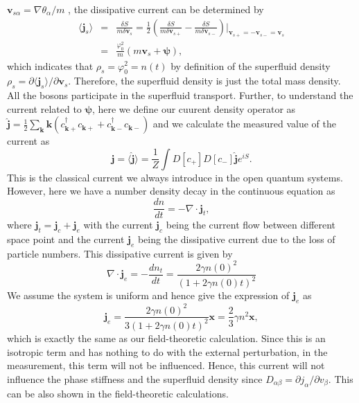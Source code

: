 \documentclass[aps,superscriptaddress,notitlepage,longbibliography]{revtex4-1}
\begin{document}
$\bm{v}_{s\alpha}=\nabla\theta_{\alpha}/m$ \citep{Coleman_2015},
the dissipative current can be determined by 
\begin{eqnarray}
\langle\bm{j}_{s}\rangle & = & \frac{\delta S}{m\delta\bm{v}_{s}}=\frac{1}{2}\left(\frac{\delta S}{m\delta\bm{v}_{s+}}-\frac{\delta S}{m\delta\bm{v}_{s-}}\right)|_{\bm{v}_{s+}=-\bm{v}_{s-}=\bm{v}_{s}}\nonumber \\
 & = & \frac{\varphi_{0}^{2}}{m}(m\bm{v}_{s}+\bm{\psi}),
\end{eqnarray}
which indicates that $\rho_{s}=\varphi_{0}^{2}=n(t)$ by definition
of the superfluid density $\rho_{s}=\partial\langle\bm{j}_{s}\rangle/\partial\bm{v}_{s}$.
Therefore, the superfluid density is just the total mass density.
All the bosons participate in the superfluid transport. Further, to
understand the current related to $\bm{\psi}$, here we define our
cuurent density operator as $\hat{\bm{j}}=\frac{1}{2}\sum_{\bm{k}}\bm{k}(c_{\bm{k}+}^{\dagger}c_{\bm{k}+}+c_{\bm{k}-}^{\dagger}c_{\bm{k}-})$
and we calculate the measured value of the current as 
\begin{equation}
\bm{j}=\langle\hat{\bm{j}}\rangle=\frac{1}{Z}\int D[c_{+}]D[c_{-}]\hat{\bm{j}}e^{iS}.
\end{equation}
This is the classical current we always introduce in the open quantum
systems. However, here we have a number density decay in the continuous
equation as 
\begin{equation}
\frac{dn}{dt}=-\nabla\cdot\bm{j}_{t},
\end{equation}
where $\bm{j}_{t}=\bm{j}_{c}+\bm{j}_{e}$ with the current $\bm{j}_{c}$
being the current flow between different space point and the current
$\bm{j}_{e}$ being the dissipative current due to the loss of particle
numbers. This dissipative current is given by 
\[
\nabla\cdot\bm{j}_{e}=-\frac{dn_{t}}{dt}=\frac{2\gamma n(0)^{2}}{(1+2\gamma n(0)t)^{2}}
\]
\[
\ 
\]
We assume the system is uniform and hence give the expression of $\bm{j}_{e}$
as 
\begin{equation}
\bm{j}_{e}=\frac{2\gamma n(0)^{2}}{3(1+2\gamma n(0)t)^{2}}\bm{x}=\frac{2}{3}\gamma n^{2}\bm{x},
\end{equation}
which is exactly the same as our field-theoretic calculation. Since
this is an isotropic term and has nothing to do with the external
perturbation, in the measurement, this term will not be influenced.
Hence, this current will not influence the phase stiffness and the
superfluid density since $D_{\alpha\beta}=\partial j_{\alpha}/\partial v_{\beta}$.
This can be also shown in the field-theoretic calculations.
\end{document}
